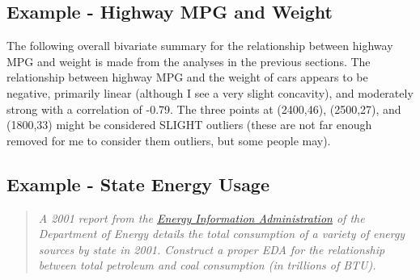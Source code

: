 \documentclass[10pt,openany]{book}\usepackage[]{graphicx}\usepackage[]{color}
\begin{document}
\subsection{Example - Highway MPG and Weight}
The following overall bivariate summary for the relationship between highway MPG and weight is made from the analyses in the previous sections.  The relationship between highway MPG and the weight of cars  appears to be negative, primarily linear (although I see a very slight concavity), and moderately strong with a correlation of -0.79.  The three points at (2400,46), (2500,27), and (1800,33) might be considered SLIGHT outliers (these are not far enough removed for me to consider them outliers, but some people may).

\subsection{Example - State Energy Usage}
\begin{quote}
\textit{A 2001 report from the \href{http://www.eia.doe.gov/}{Energy Information Administration} of the Department of Energy details the total consumption of a variety of energy sources by state in 2001.  Construct a proper EDA for the relationship between total petroleum and coal consumption (in trillions of BTU).}
\end{quote}
\end{document}
